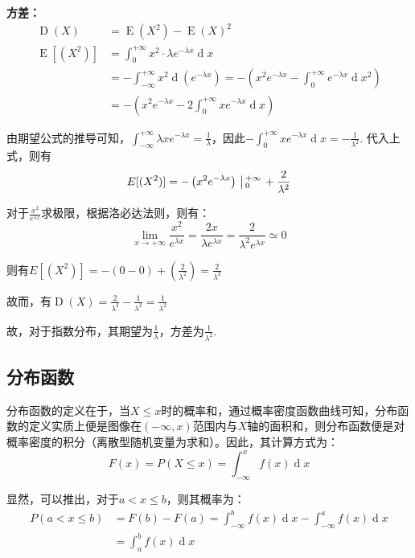 \documentclass[12pt,a4paper]{article}
\begin{document}
  \textbf{方差：}
  $$
  \begin{aligned}
    \operatorname{D} (X) &= \operatorname{E}(X^2) - \operatorname{E}(X)^2 \\
    \operatorname{E}[(X^2)] &= \int_0^{+\infty} x^2 \cdot \lambda e^{-\lambda x} \operatorname{d} x \\ 
    &= -\int_{-\infty}^{+\infty} x^2 \operatorname{d} \left(e^{-\lambda x}\right) = - \left(x^2 e^{-\lambda x} - \int _0^{+\infty}e^{-\lambda x}\operatorname{d}x^2 \right) \\ 
    &= - \left(x^2 e^{-\lambda x} - 2\int_0^{+\infty} x e^{-\lambda x} \operatorname{d} x \right)
  \end{aligned}
  $$

  由期望公式的推导可知，$\int_{-\infty}^{+\infty} \lambda x e ^{-\lambda x} = \frac{1}{\lambda}$，因此$- \int_0^{+\infty} x e^{-\lambda x} \operatorname{d} x=-\frac{1}{\lambda ^2}$. 代入上式，则有
  $$
  E[(X^2)] = - \left(x^2 e^{-\lambda x} \right) \left \arrowvert _0^{+\infty} \right. + \frac{2}{\lambda ^2}
  $$
  
  对于$\frac{x^2}{e^{\lambda x}}$求极限，根据洛必达法则，则有：
  $$
  \lim\limits_{x \rightarrow + \infty} \frac{x^2}{e^{\lambda x}} = \frac{2x}{\lambda e^{\lambda x}} = \frac{2}{\lambda ^2 e^{\lambda x}} \simeq 0
  $$

  则有$E[(X^2)]=-\left(0 - 0\right) + \left(\frac{2}{\lambda ^2}\right) = \frac{2}{\lambda ^2}$

  故而，有$\operatorname{D}(X) = \frac{2}{\lambda ^2} - \frac{1}{\lambda ^2} = \frac{1}{\lambda ^2}$

  故，对于指数分布，其期望为$\frac{1}{\lambda}$，方差为$\frac{1}{\lambda ^2}$. 

  \subsection{分布函数}
  分布函数的定义在于，当$X \leq x$时的概率和，通过概率密度函数曲线可知，分布函数的定义实质上便是图像在$(-\infty, x)$范围内与$X$轴的面积和，则分布函数便是对概率密度的积分（离散型随机变量为求和）。因此，其计算方式为：
  $$
  F(x) = P(X\leq x) = \int_{-\infty}^x f(x) \operatorname{d}x
  $$

  显然，可以推出，对于$a< x \leq b$，则其概率为：
  $$
  \begin{aligned}
    P(a < x \leq b) &= F(b) - F(a) = \int_{-\infty}^b f(x) \operatorname{d}x - \int_{-\infty}^a f(x) \operatorname{d}x \\ 
    &= \int_{a}^b f(x) \operatorname{d}x
  \end{aligned}
  $$
\end{document}
